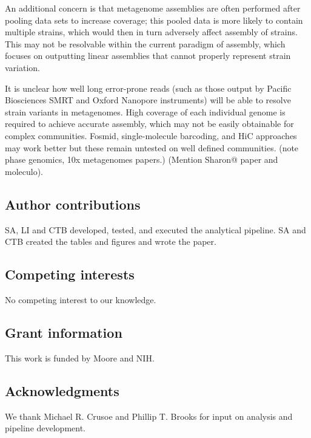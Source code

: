 \documentclass[11pt]{article}
\begin{document}
An additional concern is that metagenome assemblies are often
performed after pooling data sets to increase coverage; this pooled
data is more likely to contain multiple strains, which would then in
turn adversely affect assembly of strains.  This may not be resolvable
within the current paradigm of assembly, which focuses on outputting
linear assemblies that cannot properly represent strain variation.

It is unclear how well long error-prone reads (such as those output by
Pacific Biosciences SMRT and Oxford Nanopore instruments) will be
able to resolve strain variants in metagenomes.  High coverage of each
individual genome is required to achieve accurate assembly, which may
not be easily obtainable for complex communities.  Fosmid, single-molecule
barcoding, and HiC approaches may work better but these remain untested
on well defined communities. (note phase genomics, 10x metagenomes papers.)
(Mention Sharon@ paper and moleculo).

%

\subsection*{Author contributions}

SA, LI and CTB developed, tested, and executed the analytical pipeline.
SA and CTB created the tables and figures and wrote the paper.

\subsection*{Competing interests}
No competing interest to our knowledge.

\subsection*{Grant information}
This work is funded by Moore and NIH.

\subsection*{Acknowledgments}
We thank Michael R. Crusoe and Phillip T. Brooks for input on analysis
and pipeline development.

{\small }

\bigskip
\end{document}
